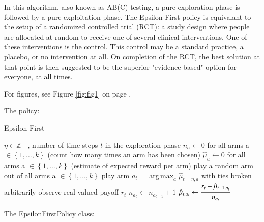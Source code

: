 \documentclass[nojss]{jss}\usepackage[]{graphicx}\usepackage[]{color}
\DeclareMathOperator*{\argmax}{arg\,max}
\begin{document}
In this algorithm, also known as AB(C) testing, a pure exploration phase is followed by a pure exploitation phase. The Epsilon First policy is equivalant to the setup of a randomized controlled trial (RCT): a study design where people are allocated at random to receive one of several clinical interventions. One of these interventions is the control. This control may be a standard practice, a placebo, or no intervention at all. On completion of the RCT, the best solution at that point is then suggested to be the superior "evidence based" option for everyone, at all times.

For figures, see Figure \ref{fig:fig1} on page \pageref{fig:fig1}.

The policy:

\begin{algorithm}
\caption{Epsilon First}
\label{Alg:EpsilonFirst}
\begin{algorithmic}
\REQUIRE \(   \eta \in \mathbb{Z}^{+} \)  , number of time steps $t$ in the exploration phase
\STATE \( n_{a} \leftarrow 0 \) for all arms a \(  \in \left\{ 1, \dots, k \right\} \)  (count how many times an arm has been chosen)
\STATE \( \hat{\mu}_{a} \leftarrow 0 \) for all arms a  \(   \in \left\{ 1, \dots, k \right\} \)  (estimate of expected reward per arm)
	       \STATE play a random arm out of all arms a \(   \in \left\{ 1, \dots, k \right\} \)
	\ELSE
	        \STATE play arm \(a_t = \argmax_a  \hat{\mu}_{t=\eta,a}  \) with ties broken arbitrarily
	\ENDIF
	\STATE observe real-valued payoff $r_t$
	\STATE \( n_{a_{t}} \leftarrow n_{a_{t-1}} + 1  \)
   \STATE \( \hat{\mu}_{t,a_{t}} \leftarrow   \cfrac{r_t - \hat{\mu}_{t-1,a_{t}} }{n_{a_{t}}}   \)
\ENDFOR
\end{algorithmic}
\end{algorithm}


The EpsilonFirstPolicy class:
\end{document}
